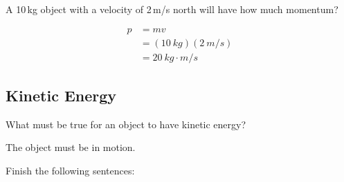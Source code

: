 \documentclass[answers]{exam}
\begin{document}
\begin{questions}


\question 
A 10\,kg object with a velocity of 2\,m/s north will have how much momentum?

\begin{solution}
    \begin{align*}
        p &= mv\\[1ex]
          &= (\SI{10}{kg})(\SI{2}{m/s})\\[1ex]
          &= \boxed{\SI{20}{kg\cdot m/s}}
    \end{align*}
\end{solution}

\clearpage
\begin{EnvUplevel}
    \subsection{Kinetic Energy}
\end{EnvUplevel}

\question
What must be true for an object to have kinetic energy?

\begin{solution}
    The object must be in motion.
\end{solution}

\question 
Finish the following sentences:

\end{questions}
\end{document}
